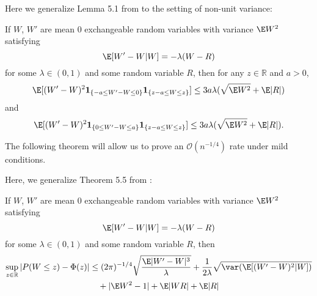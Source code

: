 Here we generalize Lemma 5.1 from \cite{chen2010normal} to the setting of non-unit variance:
\begin{theorem}
  \label{L:stein-difference-second-moment-generalization-bound}
  If $W$, $W'$ are mean 0 exchangeable random variables with variance $\E W^2$
  satisfying
  \begin{equation*}
    \E[W'-W|W] = -\lambda(W-R)
  \end{equation*}
  for some $\lambda \in (0,1)$ and some random variable $R$, then for any
  $z \in \mathbb{R}$ and $a > 0$,
  \begin{equation*}
    \E [(W'-W)^2 \mathbf{1}_{\{-a \leq W' - W \leq 0\}} \mathbf{1}_{\{z-a \leq W \leq z\}}] \leq
    3a \lambda (\sqrt{\E W^2} + \E |R|)
  \end{equation*}
  and
  \begin{equation*}
    \E [(W'-W)^2 \mathbf{1}_{\{0 \leq W' - W \leq a\}} \mathbf{1}_{\{z-a \leq W \leq z\}}] \leq
        3a \lambda (\sqrt{\E W^2} + \E |R|).
  \end{equation*}
\end{theorem}

The following theorem will allow us to prove an $\mathcal{O}(n^{-1/4})$ rate under
mild conditions.

Here, we generalize Theorem 5.5 from \cite{chen2010normal}:
\begin{theorem}
  \label{T:main}
  If $W$, $W'$ are mean 0 exchangeable random variables with variance
  $\E W^2$
  satisfying
  \begin{equation*}
    \label{eq:13}
    \E[W'-W|W] = -\lambda(W-R)
  \end{equation*}
  for some $\lambda \in (0,1)$ and some random variable $R$, then
  \begin{equation*}
    \begin{split}
      \sup_{z \in \mathbb{R}} |P(W \leq z) - \Phi(z)|
      &\leq (2\pi)^{-1/4} \sqrt{\frac{\E |W'-W|^3}{\lambda}}
      + \frac{1}{2\lambda} \sqrt{\var (\E [(W'-W)^2|W])} \\
      &\quad + |\E W^2 - 1| + \E |WR| + \E |R|
    \end{split}
  \end{equation*}
\end{theorem}

